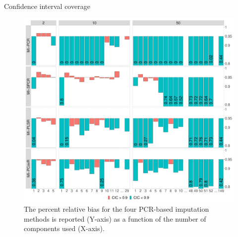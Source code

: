 \documentclass{beamer}\usepackage[]{graphicx}\usepackage[]{xcolor}
\makeatletter
\def\maxwidth{ %
  \ifdim\Gin@nat@width>\linewidth
    \linewidth
  \else
    \Gin@nat@width
  \fi
}
\newenvironment{knitrout}{}{} %
\makeatother
\begin{document}
\begin{frame}[fragile]
\begin{columns}
\begin{column}{.46\textwidth}
\begin{block}{Confidence interval coverage}
      \begin{figure}
        \centering
\begin{knitrout}
\color{fgcolor}

{\centering \includegraphics[width=\maxwidth]{figure/plot-cic-1} 

}


\end{knitrout}
          \caption{
            \label{fig:prb} 
            The percent relative bias for the four PCR-based imputation methods is reported (Y-axis) as a function of the number of components used (X-axis).
            }
        \end{figure}
    
    \end{block}
    \end{column}

  \end{columns}

  \bigskip
  {\hrulefill}
  \bigskip


\begin{columns}


\end{columns}
\end{frame}
\end{document}
